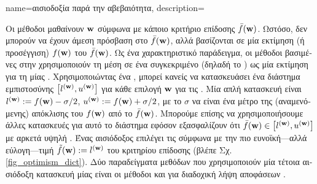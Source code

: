 {name={\foreignlanguage{greek}{αισιοδοξία παρά την αβεβαιότητα}},
	description={\foreignlanguage{greek}{Οι μέθοδοι}  
		\foreignlanguage{greek}{μαθαίνουν}  $\weights$ 
		\foreignlanguage{greek}{σύμφωνα με κάποιο κριτήριο επίδοσης $\bar{f}(\weights)$. Ωστόσο, δεν μπορούν να έχουν άμεση 
		πρόσβαση στο $\bar{f}(\weights)$, αλλά βασίζονται σε μία εκτίμηση (ή προσέγγιση) 
		$f(\weights)$ του $\bar{f}(\weights)$. Ως ένα χαρακτηριστικό παράδειγμα, οι μέθοδοι βασιμένες στην}   
		\foreignlanguage{greek}{χρησιμοποιούν τη μέση}  \foreignlanguage{greek}{σε ένα συγκεκριμένο}  
		\foreignlanguage{greek}{(δηλαδή το} ) \foreignlanguage{greek}{ως μία εκτίμηση για τη}  
		 \foreignlanguage{greek}{μίας} . \foreignlanguage{greek}{Χρησιμοποιώντας ένα} 
		, \foreignlanguage{greek}{μπορεί κανείς να κατασκευάσει ένα διάστημα εμπιστοσύνης  
		$\big[ l^{(\weights)},  u^{(\weights)} \big]$ για κάθε επιλογή $\weights$ για τις} .
		\foreignlanguage{greek}{Μία απλή κατασκευή είναι $l^{(\weights)} \defeq f(\weights) - \sigma/2$, $u^{(\weights)} \defeq f(\weights)+ \sigma/2$, 
	    	με το $\sigma$ να είναι ένα μέτρο της (αναμενόμενης) απόκλισης του $f(\weights)$ από το $\bar{f}(\weights)$.
		Μπορούμε επίσης να χρησιμοποιήσουμε άλλες κατασκευές για αυτό το διάστημα εφόσον εξασφαλίζουν ότι 
		$\bar{f}(\weights) \in\big[ l^{(\weights)},  u^{(\weights)} \big]$ 
		με αρκετά υψηλή} . \foreignlanguage{greek}{Ένας αισιόδοξος επιλέγει τις}  
		\foreignlanguage{greek}{σύμφωνα με την πιο ευνοϊκή—αλλά εύλογη—τιμή $\tilde{f}(\weights) \defeq  l^{(\weights)}$ 
		του κριτηρίου επίδοσης (βλέπε Σχ. \ref{fig_optimism_dict}). Δύο παραδείγματα μεθόδων}  
		\foreignlanguage{greek}{που χρησιμοποιούν μία τέτοια 
		αισιόδοξη κατασκευή μίας}  \foreignlanguage{greek}{είναι οι μέθοδοι}  
		\cite[\foreignlanguage{greek}{Κεφ.} 11]{ShalevMLBook} \foreignlanguage{greek}{και}  \foreignlanguage{greek}{για διαδοχική 
		λήψη αποφάσεων} \cite[Sec. 2.2]{Bubeck2012}. 
		\begin{figure}[H]
			\begin{center}
			\begin{tikzpicture}[x=3cm, y=1cm]

\end{tikzpicture}
\end{center}
\end{figure}}}
